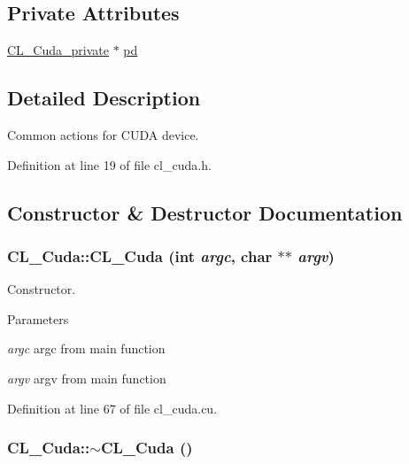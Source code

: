 \subsection*{Private Attributes}
\begin{DoxyCompactItemize}
\item 
\hyperlink{classCL__Cuda__private}{CL\_\-Cuda\_\-private} $\ast$ \hyperlink{classCL__Cuda_ac829b1e46585219ac2c30ccab6e7c9f8}{pd}
\end{DoxyCompactItemize}


\subsection{Detailed Description}
Common actions for CUDA device. 

Definition at line 19 of file cl\_\-cuda.h.

\subsection{Constructor \& Destructor Documentation}
\hypertarget{classCL__Cuda_a430d5739977a8d1dcce312be2b1badae}{
\subsubsection[{CL\_\-Cuda}]{\setlength{\rightskip}{0pt plus 5cm}CL\_\-Cuda::CL\_\-Cuda (int {\em argc}, \/  char $\ast$$\ast$ {\em argv})}}
\label{classCL__Cuda_a430d5739977a8d1dcce312be2b1badae}


Constructor. 
\begin{DoxyParams}{Parameters}
\item[{\em argc}]argc from main function \item[{\em argv}]argv from main function \end{DoxyParams}


Definition at line 67 of file cl\_\-cuda.cu.\hypertarget{classCL__Cuda_a3dd61a25d699f50fbe4b1891537d73e1}{
\subsubsection[{$\sim$CL\_\-Cuda}]{\setlength{\rightskip}{0pt plus 5cm}CL\_\-Cuda::$\sim$CL\_\-Cuda ()}}
\label{classCL__Cuda_a3dd61a25d699f50fbe4b1891537d73e1}


